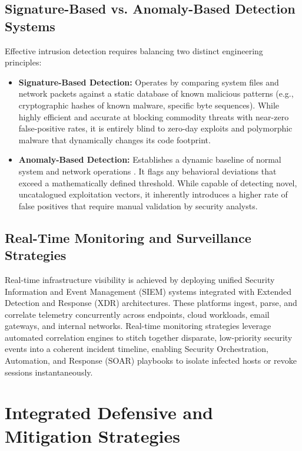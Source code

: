 \documentclass[11pt,a4paper]{article}
\begin{document}
\subsection{Signature-Based vs. Anomaly-Based Detection Systems}
Effective intrusion detection requires balancing two distinct engineering principles:
\begin{itemize}
    \item \textbf{Signature-Based Detection:} Operates by comparing system files and network packets against a static database of known malicious patterns (e.g., cryptographic hashes of known malware, specific byte sequences). While highly efficient and accurate at blocking commodity threats with near-zero false-positive rates, it is entirely blind to zero-day exploits and polymorphic malware that dynamically changes its code footprint.
    \item \textbf{Anomaly-Based Detection:} Establishes a dynamic baseline of normal system and network operations \cite{b6}. It flags any behavioral deviations that exceed a mathematically defined threshold. While capable of detecting novel, uncatalogued exploitation vectors, it inherently introduces a higher rate of false positives that require manual validation by security analysts.
\end{itemize}

\subsection{Real-Time Monitoring and Surveillance Strategies}
Real-time infrastructure visibility is achieved by deploying unified Security Information and Event Management (SIEM) systems integrated with Extended Detection and Response (XDR) architectures. These platforms ingest, parse, and correlate telemetry concurrently across endpoints, cloud workloads, email gateways, and internal networks. Real-time monitoring strategies leverage automated correlation engines to stitch together disparate, low-priority security events into a coherent incident timeline, enabling Security Orchestration, Automation, and Response (SOAR) playbooks to isolate infected hosts or revoke sessions instantaneously.

\newpage

\section{Integrated Defensive and Mitigation Strategies}
\end{document}
